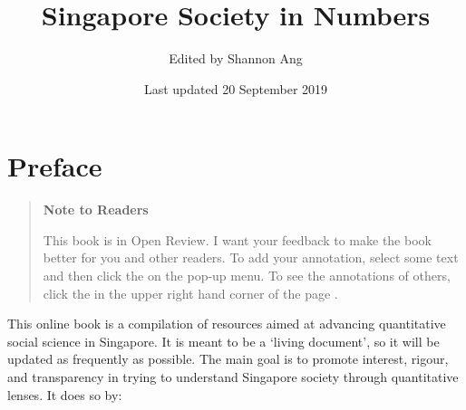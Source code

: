 \documentclass[openany]{book}
\title{Singapore Society in Numbers}
\author{Edited by Shannon Ang}
\date{Last updated 20 September 2019}
\begin{document}
\maketitle

{
\setcounter{tocdepth}{1}
\tableofcontents
}
\chapter*{Preface}\label{preface}

\begin{quote}
\textbf{Note to Readers}

This book is in Open Review. I want your feedback to make the book
better for you and other readers. To add your annotation, {select some
text} and then click the on the pop-up menu. To see the annotations of
others, click the in the upper right hand corner of the page .
\end{quote}

This online book is a compilation of resources aimed at advancing
quantitative social science in Singapore. It is meant to be a `living
document', so it will be updated as frequently as possible. The main
goal is to promote interest, rigour, and transparency in trying to
understand Singapore society through quantitative lenses. It does so by:
\end{document}
